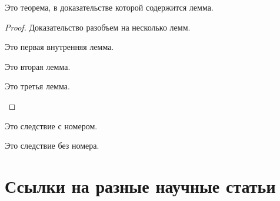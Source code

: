 \documentclass[colorthm, bib]{../civarticle}
\begin{document}
\begin{theorem}\label{thm:example:withlemm}
  Это теорема, в доказательстве которой содержится лемма.
  \Blindtext[2]
\end{theorem}
\begin{proof}
  Доказательство разобъем на несколько лемм.

  \begin{lemma}\label{lem:example:in-1}
    Это первая внутренняя лемма.
    \Blindtext[2]
  \end{lemma}

  \Blindtext[2]

  \begin{lemma}\label{lem:example:in-2}
    Это вторая лемма.
    \Blindtext[2]
  \end{lemma}

  \begin{lemma}\label{lem:example:in-3}
    Это третья лемма.
    \Blindtext[2]
  \end{lemma}

  \Blindtext[2]
 \end{proof}

 \Blindtext[11][1]

 \begin{corollary}\label{cor:example:num}
   Это следствие с номером.
   \Blindtext[2]
 \end{corollary}

 \Blindtext[2]

 \begin{corollary*}
   Это следствие без номера.
   \Blindtext[2]
 \end{corollary*}

 \Blindtext[2]


\section{Ссылки на разные научные статьи}
\label{sec:ref-to-articles}

\begin{definition}
  \label{def:001}
  \Blindtext[2]
\end{definition}

\begin{definition*}
  \Blindtext[2]
\end{definition*}

\begin{remark}
  \label{rem:001}
  \Blindtext[2]
\end{remark}

\begin{remark*}
  \Blindtext[2]
\end{remark*}
\end{document}
